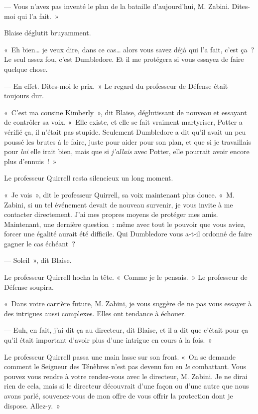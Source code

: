 --- Vous n'avez pas inventé le plan de la bataille d'aujourd'hui, M. Zabini. Dites-moi qui l'a fait.~»

Blaise déglutit bruyamment.

«~Eh bien… je veux dire, dans ce cas… alors vous savez déjà qui l'a fait, c'est ça~? Le seul assez fou, c'est Dumbledore. Et il me protégera si vous essayez de faire quelque chose.

--- En effet. Dites-moi le prix.~» Le regard du professeur de Défense était toujours dur.

«~C'est ma cousine Kimberly~», dit Blaise, déglutissant de nouveau et essayant de contrôler sa voix. «~Elle existe, et elle se fait vraiment martyriser, Potter a vérifié ça, il n'était pas stupide. Seulement Dumbledore a dit qu'il avait un peu poussé les brutes à le faire, juste pour aider pour son plan, et que si je travaillais pour \emph{lui} elle irait bien, mais que si \emph{j'allais} avec Potter, elle pourrait avoir encore plus d'ennuis~!~»

Le professeur Quirrell resta silencieux un long moment.

«~Je vois~», dit le professeur Quirrell, sa voix maintenant plus douce. «~M. Zabini, si un tel événement devait de nouveau survenir, je vous invite à me contacter directement. J'ai mes propres moyens de protéger mes amis. Maintenant, une dernière question~: même avec tout le pouvoir que vous aviez, forcer une égalité aurait été difficile. Qui Dumbledore vous a-t-il ordonné de faire gagner le cas échéant~?

--- Soleil~», dit Blaise.

Le professeur Quirrell hocha la tête. «~Comme je le pensais.~» Le professeur de Défense soupira.

«~Dans votre carrière future, M. Zabini, je vous suggère de ne pas vous essayer à des intrigues aussi complexes. Elles ont tendance à échouer.

--- Euh, en fait, j'ai dit ça au directeur, dit Blaise, et il a dit que c'était pour ça qu'il était important d'avoir plus d'une intrigue en cours à la fois.~»

Le professeur Quirrell passa une main lasse sur son front. «~On se demande comment le Seigneur des Ténèbres n'est pas devenu fou en \emph{le} combattant. Vous pouvez vous rendre à votre rendez-vous avec le directeur, M. Zabini. Je ne dirai rien de cela, mais si le directeur découvrait d'une façon ou d'une autre que nous avons parlé, souvenez-vous de mon offre de vous offrir la protection dont je dispose. Allez-y.~»

